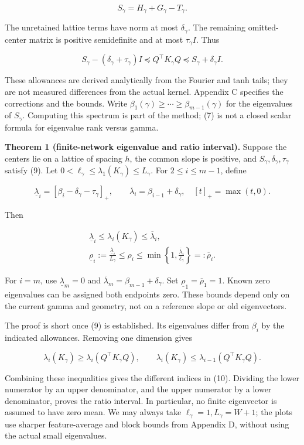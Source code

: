 \documentclass[11pt]{article}
\begin{document}
\[
S_\gamma=H_\gamma+G_\gamma-T_\gamma.
\tag{8}
\]

The unretained lattice terms have norm at most \(\delta_\gamma\). The remaining omitted-center matrix is positive semidefinite and at most \(\tau_\gamma I\). Thus

\[
S_\gamma-(\delta_\gamma+\tau_\gamma)I
\preceq Q^\top K_\gamma Q
\preceq S_\gamma+\delta_\gamma I.
\tag{9}
\]

These allowances are derived analytically from the Fourier and tanh tails; they are not measured differences from the actual kernel. Appendix C specifies the corrections and the bounds. Write \(\beta_1(\gamma)\ge\cdots\ge\beta_{m-1}(\gamma)\) for the eigenvalues of \(S_\gamma\). Computing this spectrum is part of the method; (7) is not a closed scalar formula for eigenvalue rank versus gamma.

\textbf{Theorem 1 (finite-network eigenvalue and ratio interval).} Suppose the centers lie on a lattice of spacing \(h\), the common slope is positive, and \(S_\gamma,\delta_\gamma,\tau_\gamma\) satisfy (9). Let \(0<\ell_\gamma\le\lambda_1(K_\gamma)\le L_\gamma\). For \(2\le i\le m-1\), define

\[
\underline\lambda_i=[\beta_i-\delta_\gamma-\tau_\gamma]_+,
\qquad
\overline\lambda_i=\beta_{i-1}+\delta_\gamma,
\quad [t]_+=\max(t,0).
\]

Then

\[
\boxed{
\begin{gathered}
\underline\lambda_i\le\lambda_i(K_\gamma)\le\overline\lambda_i,\\
\underline\rho_i:=\frac{\underline\lambda_i}{L_\gamma}
\le\rho_i\le
\min\!\left\{1,\frac{\overline\lambda_i}{\ell_\gamma}\right\}
=:\overline\rho_i.
\end{gathered}
}
\tag{10}
\]

For \(i=m\), use \(\underline\lambda_m=0\) and \(\overline\lambda_m=\beta_{m-1}+\delta_\gamma\). Set \(\underline\rho_1=\overline\rho_1=1\). Known zero eigenvalues can be assigned both endpoints zero. These bounds depend only on the current gamma and geometry, not on a reference slope or old eigenvectors.

The proof is short once (9) is established. Its eigenvalues differ from \(\beta_i\) by the indicated allowances. Removing one dimension gives

\[
\lambda_i(K_\gamma)\ge\lambda_i(Q^\top K_\gamma Q),
\qquad
\lambda_i(K_\gamma)\le\lambda_{i-1}(Q^\top K_\gamma Q).
\]

Combining these inequalities gives the different indices in (10). Dividing the lower numerator by an upper denominator, and the upper numerator by a lower denominator, proves the ratio interval. In particular, no finite eigenvector is assumed to have zero mean. We may always take \(\ell_\gamma=1,L_\gamma=W+1\); the plots use sharper feature-average and block bounds from Appendix D, without using the actual small eigenvalues.
\end{document}
